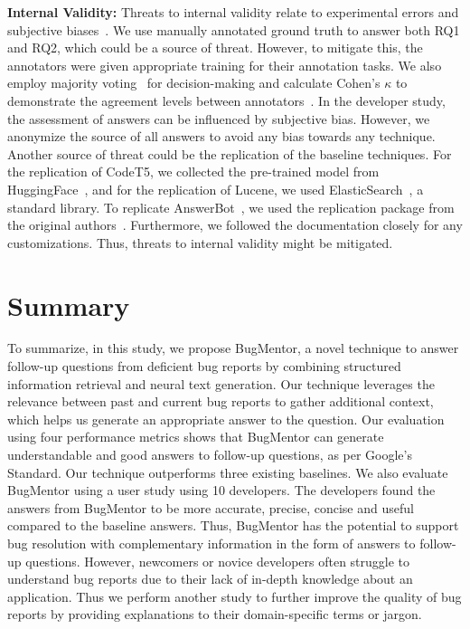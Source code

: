 \textbf{Internal Validity:} Threats to internal validity relate to experimental errors and subjective biases~\cite{christ2007experimental}. We use manually annotated ground truth to answer both RQ1 and RQ2, which could be a source of threat. However, to mitigate this, the annotators were given appropriate training for their annotation tasks. We also employ majority voting~\cite{kuhrmann2017pragmatic} for decision-making and calculate Cohen's $\kappa$ to demonstrate the agreement levels between annotators~\cite{kuhrmann2017pragmatic}.
In the developer study, the assessment of answers can be influenced by subjective bias. However, we anonymize the source of all answers to avoid any bias towards any technique.
Another source of threat could be the replication of the baseline techniques. For the replication of CodeT5, we collected the pre-trained model from HuggingFace~\cite{huggingface_t5}, and for the replication of Lucene, we used ElasticSearch~\cite{ElasticSearch}, a standard library. To replicate AnswerBot~\cite{xu2017answerbot}, we used the replication package from the original authors~\cite{maxxbw54}. Furthermore, we followed the documentation closely for any customizations. Thus, threats to internal validity might be mitigated.
 
\section{Summary} \label{Chap1:Summary}

To summarize, in this study, we propose BugMentor, a novel technique to answer follow-up questions from deficient bug reports by combining structured information retrieval and neural text generation. Our technique leverages the relevance between past and current bug reports to gather additional context, which helps us generate an appropriate answer to the question. Our evaluation using four performance metrics shows that BugMentor can generate understandable and good answers to follow-up questions, as per Google's Standard. Our technique outperforms three existing baselines. We also evaluate BugMentor using a user study using 10 developers. The developers found the answers from BugMentor to be more accurate, precise, concise and useful compared to the baseline answers. Thus, BugMentor has the potential to support bug resolution with complementary information in the form of answers to follow-up questions. However, newcomers or novice developers often struggle to understand bug reports due to their lack of in-depth knowledge about an application. Thus we perform another study to further improve the quality of bug reports by providing explanations to their domain-specific terms or jargon.
